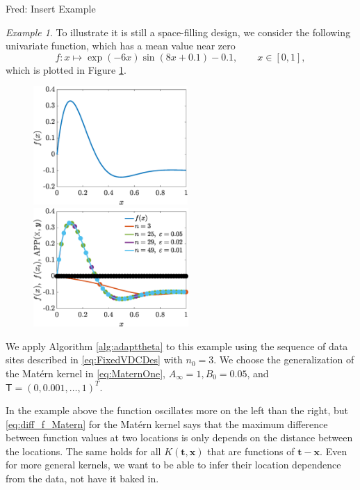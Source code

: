 \documentclass[]{mcom-l}
\theoremstyle{theorem}
\theoremstyle{remark}
\newtheorem{example}{Example}
\newcommand{\mT}{\mathsf{T}}
\newcommand{\bx}{{\boldsymbol{x}}}
\newcommand{\bt}{{\boldsymbol{t}}}
\newcommand{\FredNote}[1]{{\color{blue}Fred: #1}}
\begin{document}
\FredNote{Insert Example}
\begin{example}
\label{ex:compfun}
To illustrate it is still a space-filling design,  we consider the following univariate function, which has a mean value near zero
	\begin{equation}
	f: x \mapsto 
 \exp(-6x)\sin(8x+0.1) - 0.1,  \qquad x \in [0,1],
	\end{equation}
	which is plotted in Figure \ref{fig:ex4a}. 
		
	\begin{figure}[H]
		\centering
		\includegraphics[height = 4.5cm]{ProgramsImages/LeftPeakFunPlot.eps} \qquad
		\includegraphics[height = 4.5cm]{ProgramsImages/Alg3_LeftPeakFun_Matern_adapt_th.eps} \qquad		
		\caption{ \label{fig:ex4a}}
	\end{figure}
	We apply Algorithm \ref{alg:adapttheta} to this example using the sequence of data sites described in \eqref{eq:FixedVDCDes} with $n_0=3$. We choose the generalization of the Mat\'ern kernel in \eqref{eq:MaternOne},  $A_\infty =1, B_0 = 0.05$, and $\mT = (0, 0.001, \ldots, 1)^T$. 
	


		
	

\end{example}

 
In the example above the function oscillates more on the left than the right, but \eqref{eq:diff_f_Matern} for the Mat\'ern kernel says that the maximum difference between function values at two locations is only depends on the distance between the locations.  The same holds for all $K(\bt ,\bx)$ that are  functions of $\bt - \bx$.  Even for more general kernels, we want to be able to infer their location dependence from the data, not have it baked in.
\end{document}
